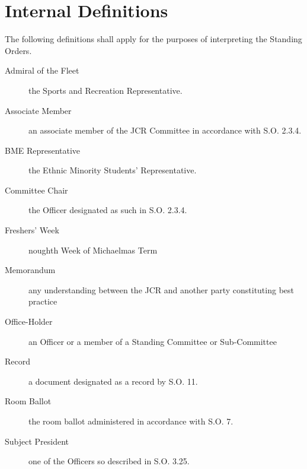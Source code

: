 \chapter{Internal Definitions}

\appnpara The following definitions shall apply for the purposes of interpreting the Standing Orders.
\begin{description}
\item[Admiral of the Fleet] the Sports and Recreation Representative.
\item[Associate Member] an associate member of the JCR Committee in accordance with S.O. 2.3.4.
\item[BME Representative] the Ethnic Minority Students’ Representative.
\item[Committee Chair] the Officer designated as such in S.O. 2.3.4.
\item[Freshers' Week] noughth Week of Michaelmas Term
\item[Memorandum] any understanding between the JCR and another party constituting best practice 
\item[Office-Holder] an Officer or a member of a Standing Committee or Sub-Committee
\item[Record] a document designated as a record by S.O. 11.
\item[Room Ballot] the room ballot administered in accordance with S.O. 7.
\item[Subject President] one of the Officers so described in S.O. 3.25.
\end{description}
